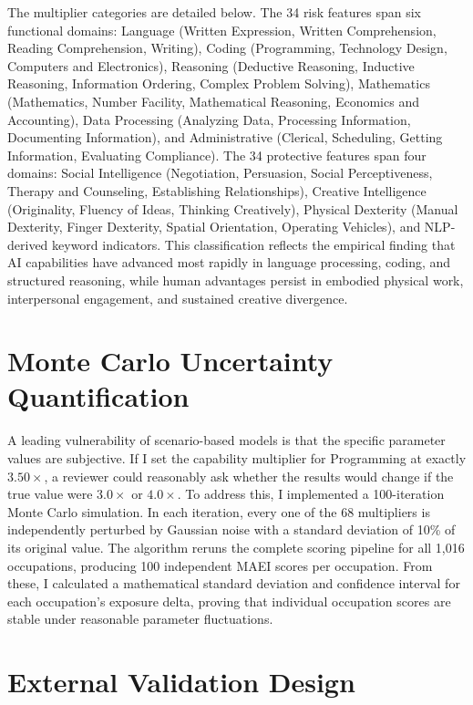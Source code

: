 The multiplier categories are detailed below. The 34 risk features span six functional domains: Language (Written Expression, Written Comprehension, Reading Comprehension, Writing), Coding (Programming, Technology Design, Computers and Electronics), Reasoning (Deductive Reasoning, Inductive Reasoning, Information Ordering, Complex Problem Solving), Mathematics (Mathematics, Number Facility, Mathematical Reasoning, Economics and Accounting), Data Processing (Analyzing Data, Processing Information, Documenting Information), and Administrative (Clerical, Scheduling, Getting Information, Evaluating Compliance). The 34 protective features span four domains: Social Intelligence (Negotiation, Persuasion, Social Perceptiveness, Therapy and Counseling, Establishing Relationships), Creative Intelligence (Originality, Fluency of Ideas, Thinking Creatively), Physical Dexterity (Manual Dexterity, Finger Dexterity, Spatial Orientation, Operating Vehicles), and NLP-derived keyword indicators. This classification reflects the empirical finding that AI capabilities have advanced most rapidly in language processing, coding, and structured reasoning, while human advantages persist in embodied physical work, interpersonal engagement, and sustained creative divergence.

\section{Monte Carlo Uncertainty Quantification}
\label{sec:monte_carlo}

A leading vulnerability of scenario-based models is that the specific parameter values are subjective. If I set the capability multiplier for Programming at exactly $3.50\times$, a reviewer could reasonably ask whether the results would change if the true value were $3.0\times$ or $4.0\times$. To address this, I implemented a 100-iteration Monte Carlo simulation. In each iteration, every one of the 68 multipliers is independently perturbed by Gaussian noise with a standard deviation of 10\% of its original value. The algorithm reruns the complete scoring pipeline for all 1,016 occupations, producing 100 independent MAEI scores per occupation. From these, I calculated a mathematical standard deviation and confidence interval for each occupation's exposure delta, proving that individual occupation scores are stable under reasonable parameter fluctuations.

\section{External Validation Design}
\label{sec:external_validation}

